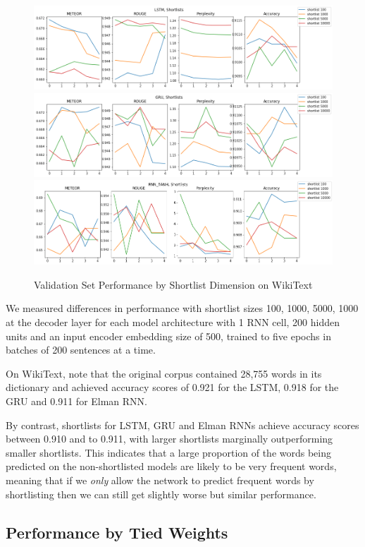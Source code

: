 \documentclass[a4paper]{article}
\begin{document}
\begin{figure}[!ht]
\includegraphics[width=0.8\columnwidth]{sr-perf-by-shortlist-lstm}
\includegraphics[width=0.8\columnwidth]{sr-perf-by-shortlist-gru}
\includegraphics[width=0.8\columnwidth]{sr-perf-by-shortlist-rnn}
\centering
\caption{Validation Set Performance by Shortlist Dimension on WikiText}
\end{figure}

We measured differences in performance with shortlist sizes 100, 1000, 5000, 1000
at the decoder layer for each model architecture with 1 RNN cell, 200 hidden units and
an input encoder embedding size of 500, trained to five epochs in batches of 200 sentences at a time.

On WikiText, note that the original corpus contained 28,755 words in its
dictionary and achieved accuracy scores of 0.921 for the LSTM, 0.918 for the GRU
and 0.911 for Elman RNN.

By contrast, shortlists for LSTM, GRU and Elman RNNs
achieve accuracy scores between 0.910 and to 0.911,
with larger shortlists marginally outperforming smaller
shortlists. This indicates that a large proportion of
the words being predicted on the non-shortlisted
models are likely to be very frequent words, meaning
that if we \emph{only} allow the network to predict
frequent words by shortlisting then we can still get
slightly worse but similar performance.

\subsection{Performance by Tied Weights}
\label{sec:perf_by_tiedweights}
\end{document}

